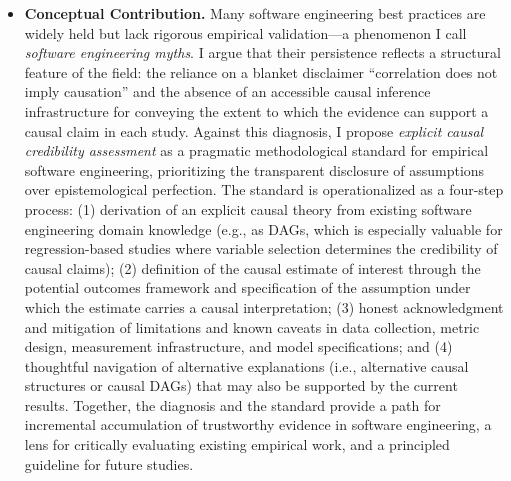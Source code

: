\begin{itemize}[leftmargin=15pt]
    \item \textbf{Conceptual Contribution.} Many software engineering best practices are widely held but lack rigorous empirical validation---a phenomenon I call \emph{software engineering myths}.
    I argue that their persistence reflects a structural feature of the field: the reliance on a blanket disclaimer ``correlation does not imply causation'' and the absence of an accessible causal inference infrastructure for conveying the extent to which the evidence can support a causal claim in each study.
    Against this diagnosis, I propose \emph{explicit causal credibility assessment} as a pragmatic methodological standard for empirical software engineering, prioritizing the transparent disclosure of assumptions over epistemological perfection.
    The standard is operationalized as a four-step process: (1) derivation of an explicit causal theory from existing software engineering domain knowledge (e.g., as DAGs, which is especially valuable for regression-based studies where variable selection determines the credibility of causal claims); (2) definition of the causal estimate of interest through the potential outcomes framework and specification of the assumption under which the estimate carries a causal interpretation; (3) honest acknowledgment and mitigation of limitations and known caveats in data collection, metric design, measurement infrastructure, and model specifications; and (4) thoughtful navigation of alternative explanations (i.e., alternative causal structures or causal DAGs) that may also be supported by the current results.
    Together, the diagnosis and the standard provide a path for incremental accumulation of trustworthy evidence in software engineering, a lens for critically evaluating existing empirical work, and a principled guideline for future studies.


\end{itemize}
